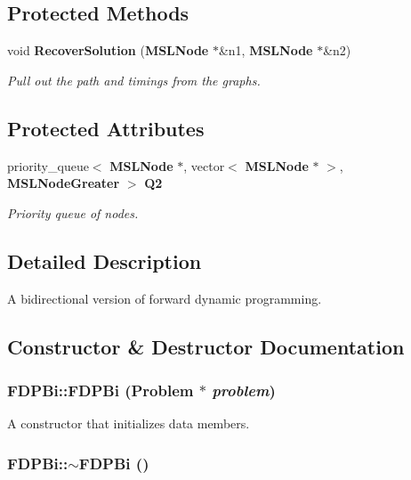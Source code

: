 \subsection*{Protected Methods}
\begin{CompactItemize}
\item 
void {\bf Recover\-Solution} ({\bf MSLNode} $\ast$\&n1, {\bf MSLNode} $\ast$\&n2)
\begin{CompactList}\small\item\em Pull out the path and timings from the graphs.\item\end{CompactList}\end{CompactItemize}
\subsection*{Protected Attributes}
\begin{CompactItemize}
\item 
priority\_\-queue$<$ {\bf MSLNode} $\ast$, vector$<$ {\bf MSLNode} $\ast$ $>$, {\bf MSLNode\-Greater} $>$ {\bf Q2}
\begin{CompactList}\small\item\em Priority queue of nodes.\item\end{CompactList}\end{CompactItemize}


\subsection{Detailed Description}
A bidirectional version of forward dynamic programming.



\subsection{Constructor \& Destructor Documentation}
\subsubsection{\setlength{\rightskip}{0pt plus 5cm}FDPBi::FDPBi ({\bf Problem} $\ast$ {\em problem})}\label{classFDPBi_a0}


A constructor that initializes data members.

\subsubsection{\setlength{\rightskip}{0pt plus 5cm}FDPBi::$\sim$FDPBi ()\hspace{0.3cm}{\tt  [inline]}}\label{classFDPBi_a1}


